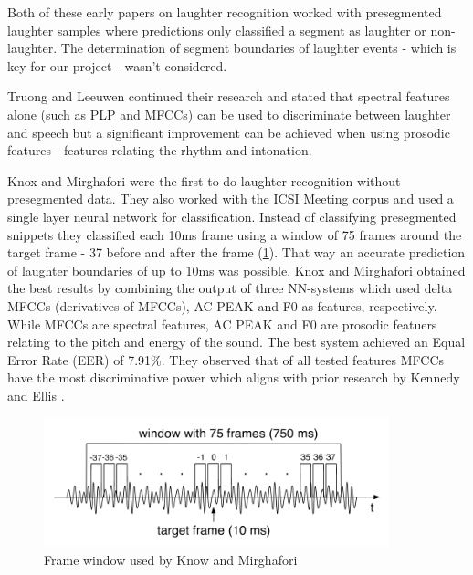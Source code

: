 \documentclass[bsc,frontabs,parskip,deptreport]{infthesis}
\begin{document}
Both of these early papers on laughter recognition worked with presegmented laughter samples where predictions only classified a segment as laughter or non-laughter. The determination of segment boundaries of laughter events - which is key for our project - wasn't considered. 

Truong and Leeuwen \cite{truong2007automatic} continued their research and stated that spectral features alone (such as PLP and MFCCs) can be used to discriminate between laughter and speech but a significant improvement can be achieved when using prosodic features - features relating the rhythm and intonation.

Knox and Mirghafori \cite{knox2006automatic} were the first to do laughter recognition without presegmented data.
They also worked with the ICSI Meeting corpus \cite{morgan2001meeting} and used a single layer neural network for classification.
Instead of classifying presegmented snippets they classified each 10ms frame using a window of 75 frames around the target frame - 37 before and after the frame (\ref{fig:know_window}).
That way an accurate prediction of laughter boundaries of up to 10ms was possible. 
Knox and Mirghafori obtained the best results by combining the output of three NN-systems which used delta MFCCs (derivatives of MFCCs), AC PEAK and F0 as features, respectively. While MFCCs are spectral features, AC PEAK and F0 are prosodic featuers relating to the pitch and energy of the sound.
The best system achieved an Equal Error Rate (EER) of 7.91\%.
They observed that of all tested features MFCCs have the most discriminative power which aligns with prior research by Kennedy and Ellis \cite{kennedy2004laughter}.

\begin{figure}[htp]
    \centering
    \includegraphics[width=10cm]{imgs/Knox_window.png}
    \caption{Frame window used by Know and Mirghafori}
    \label{fig:know_window}
\end{figure}
\end{document}
